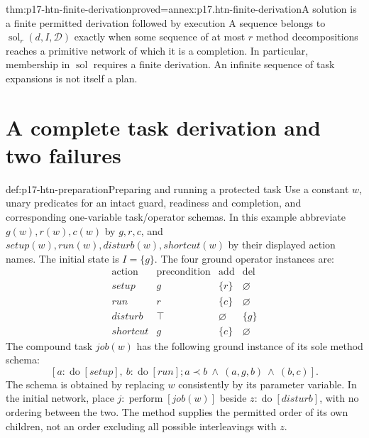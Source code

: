 \begin{hbtheorem}{thm:p17-htn-finite-derivation}{proved=annex:p17.htn-finite-derivation}{A solution is a finite permitted derivation followed by execution}
A sequence belongs to \(\operatorname{sol}_r(d,I,\mathcal D)\) exactly when
some sequence of at most \(r\) method decompositions reaches a primitive
network of which it is a completion. In particular, membership in
\(\operatorname{sol}\) requires a finite derivation. An infinite sequence
of task expansions is not itself a plan.
\end{hbtheorem}

\section{A complete task derivation and two failures}
\label{sec:p17-htn-example}

\begin{hbexample}{def:p17-htn-preparation}{Preparing and running a protected task}
Use a constant \(w\), unary predicates for an intact guard, readiness and
completion, and corresponding one-variable task/operator schemas. In this
example abbreviate \(g(w),r(w),c(w)\) by \(g,r,c\), and
\(\mathit{setup}(w),\mathit{run}(w),\mathit{disturb}(w),\mathit{shortcut}(w)\)
by their displayed action names. The initial state is \(I=\{g\}\).
The four ground operator instances are:
\[
 \begin{array}{c|c|c|c}
 \text{action}&\text{precondition}&\operatorname{add}&\operatorname{del}\\\hline
 \mathit{setup}&g&\{r\}&\varnothing\\
 \mathit{run}&r&\{c\}&\varnothing\\
 \mathit{disturb}&\top&\varnothing&\{g\}\\
 \mathit{shortcut}&g&\{c\}&\varnothing
 \end{array}
\]
The compound task \(\mathit{job}(w)\) has the following ground instance of
its sole method schema:
\[
 [a:\operatorname{do}[\mathit{setup}],\ b:\operatorname{do}[\mathit{run}];
 a\prec b\ \land\ (a,g,b)\ \land\ (b,c)].
\]
The schema is obtained by replacing \(w\) consistently by its parameter
variable. In the initial network, place
\(j:\operatorname{perform}[\mathit{job}(w)]\)
beside \(z:\operatorname{do}[\mathit{disturb}]\), with no ordering between
the two. The method supplies the permitted order of its own children, not an
order excluding all possible interleavings with \(z\).
\end{hbexample}

